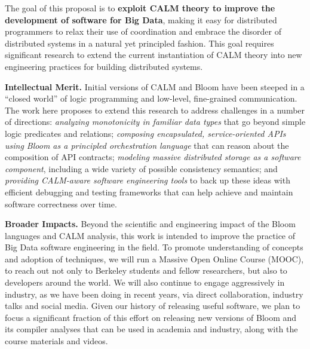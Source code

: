 The goal of this proposal is to \textbf{exploit CALM theory to improve the development of software for Big Data}, making it easy for distributed programmers to relax their use of coordination and embrace the disorder of distributed systems in a natural yet principled fashion.  This goal requires significant research to extend the current instantiation of CALM theory into new engineering practices for building distributed systems.  


\vspace{6pt}
\noindent \textbf{Intellectual Merit.} Initial versions of CALM and Bloom have been steeped in a ``closed world'' of logic programming and low-level, fine-grained communication.  The work here proposes to extend this research to address challenges in a number of directions: \emph{analyzing monotonicity in familiar data types} that go beyond simple logic predicates and relations; \emph{composing encapsulated, service-oriented APIs using Bloom as a principled orchestration language} that can reason about the composition of API contracts; \emph{modeling massive distributed storage as a software component}, including a wide variety of possible consistency semantics; and \emph{providing CALM-aware software engineering tools} to back up these ideas with efficient debugging and testing frameworks that can help achieve and maintain software correctness over time.
 
\vspace{6pt}
\noindent \textbf{Broader Impacts.} Beyond the scientific and engineering impact of the Bloom languages and CALM analysis, this work is intended to improve the practice of Big Data software engineering in the field.  To promote understanding of concepts and adoption of techniques, we will run a Massive Open Online Course (MOOC), to reach out not only to Berkeley students and fellow researchers, but also to developers around the world. We will also continue to engage aggressively in industry, as we have been doing in recent years, via direct collaboration, industry talks and social media.  Given our history of releasing useful software, we plan to focus a significant fraction of this effort on releasing new versions of Bloom and its compiler analyses that can be used in academia and industry, along with the course materials and videos.

% 